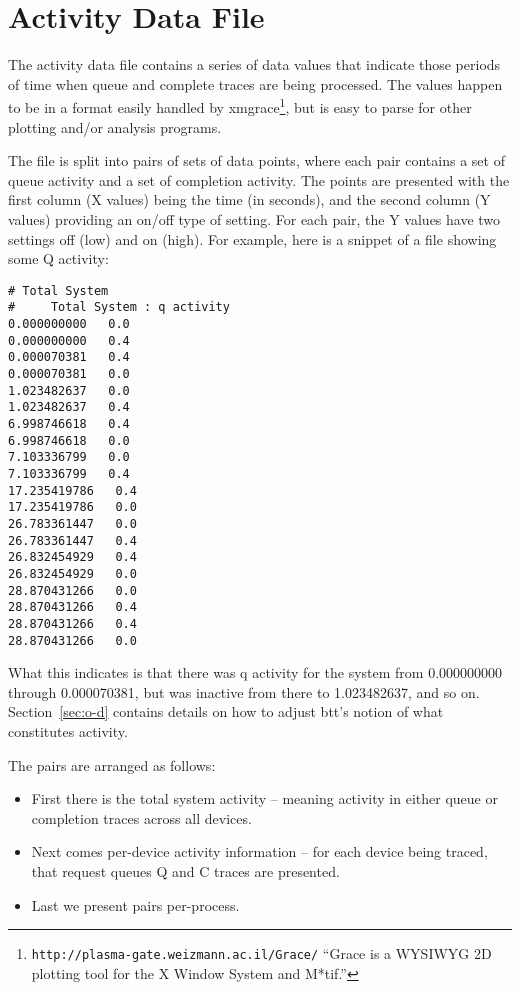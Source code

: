 \documentclass{article}
\begin{document}
\newpage\section{\label{sec:activity}Activity Data File}

  The activity data file contains a series of data values that indicate
  those periods of time when queue and complete traces are being
  processed.  The values happen to be in a format easily handled by
  xmgrace\footnote{\texttt{http://plasma-gate.weizmann.ac.il/Grace/}
  ``Grace is a WYSIWYG 2D plotting tool for the X Window System and
  M*tif.''}, but is easy to parse for other plotting and/or analysis
  programs.

  The file is split into pairs of sets of data points, where each pair
  contains a set of queue activity and a set of completion activity. The
  points are presented with the first column (X values) being the time
  (in seconds), and the second column (Y values) providing an on/off
  type of setting. For each pair, the Y values have two settings off
  (low) and on (high). For example, here is a snippet of a file showing
  some Q activity:

\begin{verbatim}
# Total System
#     Total System : q activity
0.000000000   0.0
0.000000000   0.4
0.000070381   0.4
0.000070381   0.0
1.023482637   0.0
1.023482637   0.4
6.998746618   0.4
6.998746618   0.0
7.103336799   0.0
7.103336799   0.4
17.235419786   0.4
17.235419786   0.0
26.783361447   0.0
26.783361447   0.4
26.832454929   0.4
26.832454929   0.0
28.870431266   0.0
28.870431266   0.4
28.870431266   0.4
28.870431266   0.0
\end{verbatim}

  What this indicates is that there was q activity for the system
  from 0.000000000 through 0.000070381, but was inactive from there to
  1.023482637, and so on. Section~\ref{sec:o-d} contains details on how
  to adjust btt's notion of what constitutes activity.

  The pairs are arranged as follows:

  \begin{itemize}
    \item First there is the total system activity -- meaning activity
    in either queue or completion traces across all devices.

    \item Next comes per-device activity information -- for each device
    being traced, that request queues Q and C traces are presented.

    \item Last we present pairs per-process.
  \end{itemize}
\end{document}
